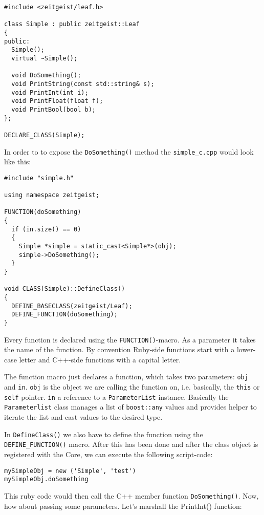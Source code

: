 \begin{verbatim}
#include <zeitgeist/leaf.h>

class Simple : public zeitgeist::Leaf
{
public:
  Simple();
  virtual ~Simple();
  
  void DoSomething();
  void PrintString(const std::string& s);
  void PrintInt(int i);
  void PrintFloat(float f);
  void PrintBool(bool b);
};

DECLARE_CLASS(Simple);
\end{verbatim}

In order to to expose the \texttt{DoSomething()} method the
\texttt{simple\_c.cpp} would look like this:

\begin{verbatim}
#include "simple.h"

using namespace zeitgeist;

FUNCTION(doSomething)
{
  if (in.size() == 0)
  {
    Simple *simple = static_cast<Simple*>(obj);
    simple->DoSomething();
  }
}

void CLASS(Simple)::DefineClass()
{
  DEFINE_BASECLASS(zeitgeist/Leaf);
  DEFINE_FUNCTION(doSomething);
}
\end{verbatim}


Every function is declared using the \texttt{FUNCTION()}-macro. As a
parameter it takes the name of the function. By convention Ruby-side
functions start with a lower-case letter and C++-side functions with a
capital letter. 

The function macro just declares a function, which takes two
parameters: \texttt{obj} and \texttt{in}. \texttt{obj} is the object
we are calling the function on, i.e. basically, the \texttt{this} or
\texttt{self} pointer. \texttt{in} a reference to a \texttt{ParameterList} 
instance. Basically the \texttt{Parameterlist} class manages a list of
\texttt{boost::any} values and provides helper to iterate the list and cast 
values to the desired type.

In \texttt{DefineClass()} we also have to define the function using
the \texttt{DEFINE\_FUNCTION()} macro. After this has been done and
after the class object is registered with the Core, we can execute the
following script-code:

\begin{verbatim}
mySimpleObj = new ('Simple', 'test')
mySimpleObj.doSomething
\end{verbatim}

This ruby code would then call the C++ member function
\texttt{DoSomething()}. Now, how about passing some parameters. Let's marshall
the PrintInt() function:

